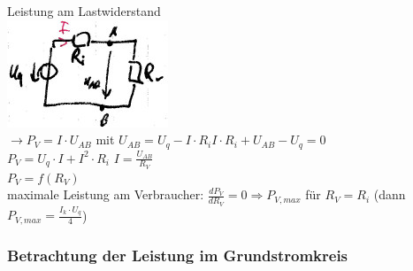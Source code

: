 Leistung am Lastwiderstand\\
\includegraphics[scale=.75]{Abbildungen/ABB313}\\
$\rightarrow P_V = I\cdot U_{AB}$ \quad mit $U_{AB}=U_q-I\cdot R_i$\quad $I\cdot R_i + U_{AB}-U_q=0$\\
$P_V=U_q\cdot I + I^2 \cdot R_i$ \quad $I=\frac{U_{AB}}{R_V}$\\
$P_V=f(R_V)$\\
maximale Leistung am Verbraucher: $\frac{d P_V}{dR_V}=0 \Rightarrow P_{V,max}$ für $R_V=R_i$ (dann $P_{V,max}=\frac{I_k \cdot U_q}{4}$)

\subsubsection{Betrachtung der Leistung im Grundstromkreis}

